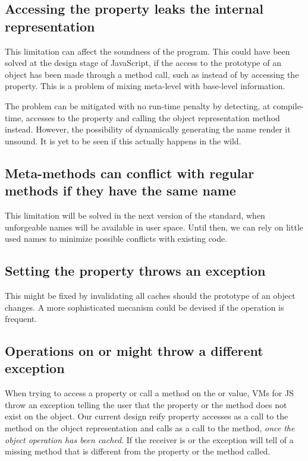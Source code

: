 \subsection{Accessing the  property leaks the internal representation}

This limitation can affect the soundness of the program. This could have been
solved at the design stage of JavaScript, if the access to the prototype of an
object has been made through a method call, such as  instead
of by accessing the  property. This is a problem of mixing
meta-level with base-level information.

The problem can be mitigated with no run-time penalty by detecting, at
compile-time, accesses to the  property and calling the object
representation  method instead. However, the possibility of
dynamically generating the  name render it unsound. It
is yet to be seen if this actually happens in the wild.

\subsection{Meta-methods can conflict with regular methods if they have the same name}

This limitation will be solved in the next version of the standard, when
unforgeable names will be available in user space.  Until then, we can rely on
little used names to minimize possible conflicts with existing code.

\subsection{Setting the  property throws an exception}

This might be fixed by invalidating all caches should the prototype of an
object changes. A more sophisticated mecanism could be devised if the operation
is frequent.

\subsection{Operations on  or  might throw a different exception}

When trying to access a property or call a method on the  or
 value, VMs for JS throw an exception telling the user that the
property or the method does not exist on the object. Our current design reify
property accesses as a call to the  method on the object representation
and calls as a call to the  method, \textit{once the object operation
has been cached}. If the receiver is  or  the exception
will tell of a missing method that is different from the property or the method
called.

